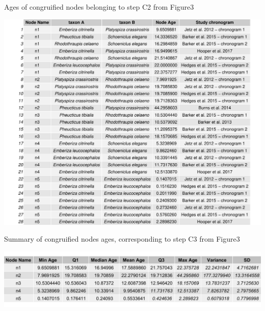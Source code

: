 \documentclass[
  english,
  man]{apa6}
\begin{document}
\begin{table}
  \caption{Ages of congruified nodes belonging to step C2 from Figure3}
  \label{tbl:table1}
  \includegraphics[width=\linewidth]{../tables/table-fringillidae-small-example.pdf}
\end{table}


\begin{table}
  \caption{Summary of congruified nodes ages, corresponding to step C3 from Figure3}
  \label{tbl:table2}
  \includegraphics[width=\linewidth]{../tables/table-fringillidae-small-example-summary.png}
\end{table}

\end{document}
